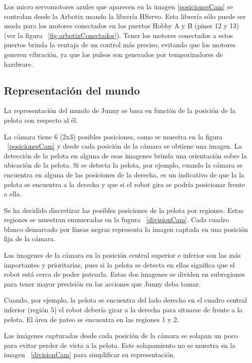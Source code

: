 Los micro servomotores azules que aparecen en la imagen \ref{posicionesCam} se controlan desde la Arbotix usando la librería HServo. Esta librería s\'olo puede ser usada para los motores conectados en los puertos Hobby A y B (pines 12 y 13) (ver la figura ~\ref{fig:arbotixConectados}). Tener los motores conectados a estos puertos brinda la ventaja de un control más preciso, evitando que los motores generen vibración, ya que los pulsos son generados por temporizadores de hardware. 

\subsection{Representaci\'on del mundo}\label{mundo}

La representación del mundo de Junny se basa en función de la posición de la pelota con respecto al él. 

La cámara tiene 6 (2x3) posibles posiciones, como se muestra en la figura ~\ref{posicionesCam} y desde cada posición de la cámara se obtiene una imagen. La detección de la pelota en alguna de esas imagenes brinda una orientación sobre la ubicación de la pelota. Si se detecta la pelota, por ejemplo, cuando la cámara se encuentra en alguna de las posiciones de la derecha, es un indicativo de que la la pelota se encuentra a la derecha y que si el robot gira se podría posicionar frente a ella. 

Se ha decidido discretizar las posibles posiciones de la pelota por regiones. Estas regiones se muestran enumeradas en la fugura ~\ref{divisionCam}. Cada cuadro blanco demarcado por líneas negras representa la imagen captada en una posición fija de la cámara. 

Las imagenes de la cámara en la posición central superior e inferior son las más importantes y prioritarias, pues si la pelota se detecta en ellas significa que el robot está cerca de poder patearla. Estas dos imagenes se dividen en subregiones para tener mayor precisión en las acciones que Junny deba tomar.

Cuando, por ejemplo, la pelota se encuentra del lado derecho en el cuadro central inferior (región 5) el robot debería girar a la derecha para situarse de frente a la pelota. El área de pateo se encuentra en las regiones 1 y 2.

Las imágenes capturadas desde cada posición de la cámara se solapan un poco para evitar perder de vista a la pelota. Este solapamiento no se muestra en la imagen ~\ref{divisionCam} para simplificar su representación.

